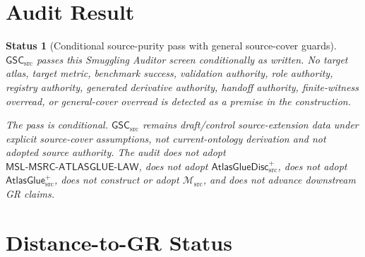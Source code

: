 \documentclass[11pt]{article}
\newcommand{\Msrc}{\mathcal{M}_{\mathrm{src}}}
\newcommand{\AtlasGlue}{\mathsf{AtlasGlue}_{\mathrm{src}}^{+}}
\newcommand{\AtlasGlueDisc}{\mathsf{AtlasGlueDisc}_{\mathrm{src}}^{+}}
\newcommand{\MSL}{\mathsf{MSL}\mbox{-}\mathsf{MSRC}\mbox{-}\mathsf{ATLASGLUE}\mbox{-}\mathsf{LAW}}
\newcommand{\GSC}{\mathsf{GSC}_{\mathrm{src}}}
\newtheorem{status}{Status}
\begin{document}
\section{Audit Result}

\begin{status}[Conditional source-purity pass with general source-cover guards]
\(\GSC\) passes this Smuggling Auditor screen conditionally as written. No
target atlas, target metric, benchmark success, validation authority, role
authority, registry authority, generated derivative authority, handoff
authority, finite-witness overread, or general-cover overread is detected as a
premise in the construction.

The pass is conditional. \(\GSC\) remains draft/control source-extension data
under explicit source-cover assumptions, not current-ontology derivation and
not adopted source authority. The audit does not adopt \(\MSL\), does not
adopt \(\AtlasGlueDisc\), does not adopt \(\AtlasGlue\), does not construct
or adopt \(\Msrc\), and does not advance downstream GR claims.
\end{status}

\section{Distance-to-GR Status}
\end{document}
